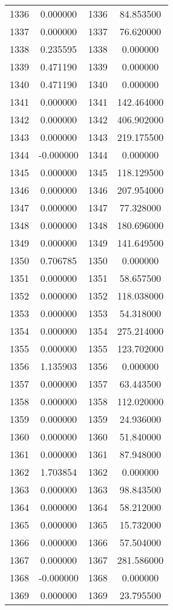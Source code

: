 \documentclass[12pt]{article}
\begin{document}
\begin{longtable}{@{}cccc@{}}
1336 & 0.000000 & 1336 & 84.853500 \\
1337 & 0.000000 & 1337 & 76.620000 \\
1338 & 0.235595 & 1338 & 0.000000 \\
1339 & 0.471190 & 1339 & 0.000000 \\
1340 & 0.471190 & 1340 & 0.000000 \\
1341 & 0.000000 & 1341 & 142.464000 \\
1342 & 0.000000 & 1342 & 406.902000 \\
1343 & 0.000000 & 1343 & 219.175500 \\
1344 & -0.000000 & 1344 & 0.000000 \\
1345 & 0.000000 & 1345 & 118.129500 \\
1346 & 0.000000 & 1346 & 207.954000 \\
1347 & 0.000000 & 1347 & 77.328000 \\
1348 & 0.000000 & 1348 & 180.696000 \\
1349 & 0.000000 & 1349 & 141.649500 \\
1350 & 0.706785 & 1350 & 0.000000 \\
1351 & 0.000000 & 1351 & 58.657500 \\
1352 & 0.000000 & 1352 & 118.038000 \\
1353 & 0.000000 & 1353 & 54.318000 \\
1354 & 0.000000 & 1354 & 275.214000 \\
1355 & 0.000000 & 1355 & 123.702000 \\
1356 & 1.135903 & 1356 & 0.000000 \\
1357 & 0.000000 & 1357 & 63.443500 \\
1358 & 0.000000 & 1358 & 112.020000 \\
1359 & 0.000000 & 1359 & 24.936000 \\
1360 & 0.000000 & 1360 & 51.840000 \\
1361 & 0.000000 & 1361 & 87.948000 \\
1362 & 1.703854 & 1362 & 0.000000 \\
1363 & 0.000000 & 1363 & 98.843500 \\
1364 & 0.000000 & 1364 & 58.212000 \\
1365 & 0.000000 & 1365 & 15.732000 \\
1366 & 0.000000 & 1366 & 57.504000 \\
1367 & 0.000000 & 1367 & 281.586000 \\
1368 & -0.000000 & 1368 & 0.000000 \\
1369 & 0.000000 & 1369 & 23.795500 \\

\end{longtable}
\end{document}
